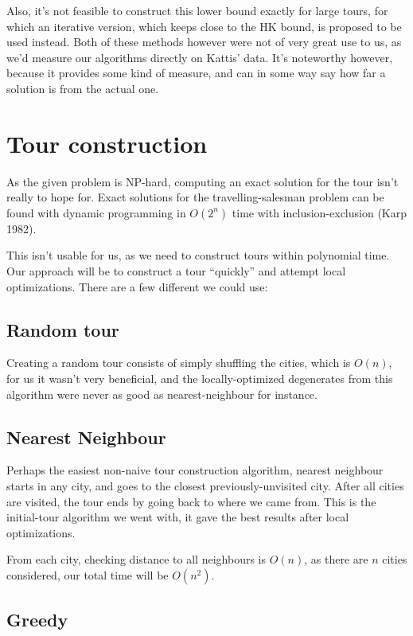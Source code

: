 \documentclass[a4paper,12pt,oneside]{article}
\begin{document}
Also, it's not feasible to construct this lower bound exactly for large tours, for which an iterative version, which keeps close to the HK bound, is proposed to be used instead. Both of these methods however were not of very great use to us, as we'd measure our algorithms directly on Kattis' data. It's noteworthy however, because it provides some kind of measure, and can in some way say how far a solution is from the actual one.

\section{Tour construction}

As the given problem is NP-hard, computing an exact solution for the tour isn't really to hope for. Exact solutions for the travelling-salesman problem can be found with dynamic programming in $O(2^n)$ time with inclusion-exclusion (Karp 1982).

This isn't usable for us, as we need to construct tours within polynomial time. Our approach will be to construct a tour ``quickly'' and attempt local optimizations. There are a few different we could use:

\subsection{Random tour}

Creating a random tour consists of simply shuffling the cities, which is $O(n)$, for us it wasn't very beneficial, and the locally-optimized degenerates from this algorithm were never as good as nearest-neighbour for instance. 

\subsection{Nearest Neighbour}

Perhaps the easiest non-naive tour construction algorithm, nearest neighbour starts in any city, and goes to the closest previously-unvisited city. After all cities are visited, the tour ends by going back to where we came from. This is the initial-tour algorithm we went with, it gave the best results after local optimizations.

From each city, checking distance to all neighbours is $O(n)$, as there are $n$ cities considered, our total time will be $O(n^2)$.

\subsection{Greedy}
\end{document}
